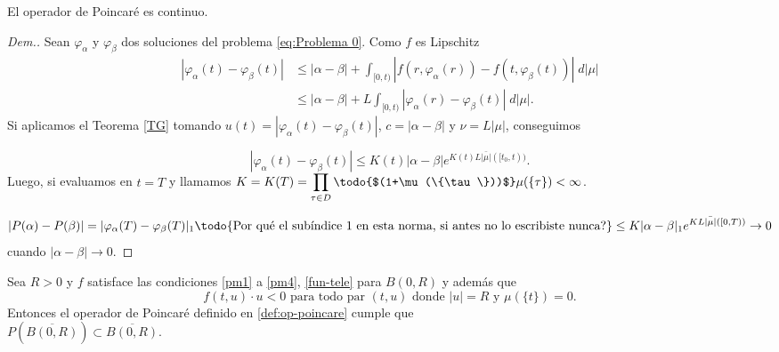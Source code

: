  
 \begin{lem}
    El operador de Poincaré es continuo.\label{opr continuo}
\end{lem}
\begin{proof}[Dem.]
 Sean $\varphi_\alpha$ y $\varphi_\beta$ dos soluciones del problema \eqref{eq:Problema 0}. Como $f$ es Lipschitz 
 \begin{equation*}
 \begin{split}
 	| \varphi_\alpha(t)-\varphi_\beta(t)|&\leq |\alpha-\beta |+\int_{[0,t)} |f(r,\varphi_\alpha(r)) -f(t,\varphi_\beta(t))| \; d|\mu|\\
	&\leq |\alpha-\beta|+L\int_{[0,t)} |\varphi_\alpha(r) -\varphi_\beta(t)| \; d|\mu|.
 \end{split}
\end{equation*}
 Si aplicamos el Teorema \ref{TG} tomando $u(t)=|\varphi_\alpha(t)-\varphi_\beta(t)|$, $c=|\alpha-\beta|$ y  $\nu=L|\mu|$, conseguimos

\begin{equation*}
|\varphi_\alpha(t)-\varphi_\beta(t)|\leq K(t) |\alpha-\beta|e^{K(t)L\bar{|\mu|}([t_0,t))}.
\end{equation*}
Luego, si evaluamos en $t=T$ y llamamos  $K=K(T)=\displaystyle\prod_{\tau\in D}\textrm{\todo{$(1+\mu(\{\tau\}))$}}\mu(\{\tau\})<\infty$.
 

\begin{equation*}
 		|P(\alpha)-P(\beta)|=|\varphi_{\alpha}(T)-\varphi_{\beta}(T)|_{1}\textrm{\todo{Por qué el subíndice 1 en esta norma, si antes no lo escribiste nunca?}}\leq K |\alpha-\beta|_{1}e^{KL\bar{|\mu|}([0,T))}\to 0
 	\end{equation*}
 cuando $|\alpha-\beta|\to 0$.
\end{proof}
 
 
 

 
 

 \begin{thm} \label{th: P}
 	Sea $R>0$ y $f$ satisface las condiciones \ref{pm1} a \ref{pm4},  \ref{fun-tele} para $B(0,R)$  y  además que
 	\begin{equation}
 		f(t,u)\cdot u<0 \text{ para todo par } (t,u) \text{ donde }  |u| =R  \text{ y   } \mu(\{t\})=0.  \label{eq:4}
 	\end{equation}
 Entonces el operador de Poincaré definido en \ref{def:op-poincare} cumple que \\
 $P\left(  \overline{B(0,R)}\right)  \subset \overline{B(0,R)}$.
 \end{thm}
 

